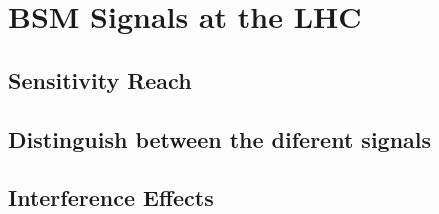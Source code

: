 \chapter{BSM Signals at the LHC}

\section{Sensitivity Reach}

\section{Distinguish between the diferent signals}

\section{Interference Effects}